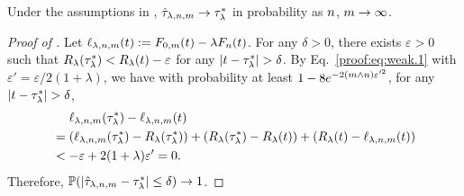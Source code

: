 \begin{lemma}\label{lemm:consistency}
Under the assumptions in ,
${\hat{\tau}_{\lambda, {n}, m}} \to {\tau^*_\lambda}$ in probability as ${n}$, $m \to \infty$.
\end{lemma}


\begin{proof}[Proof of ]
    Let ${{\ell}_{\lambda, {n}, m}}({t}):= {{F}_{0,m}}({t}) - \lambda {{F}_n}({t})$.
    For any $\delta > 0$, there exists $\varepsilon > 0$ such that ${R_{\lambda}}({\tau^*_\lambda}) < {R_{\lambda}}({t}) - \varepsilon$ for any $|{t} - {\tau^*_\lambda}| > \delta$.
    By Eq.~\eqref{proof:eq:weak.1} with $\varepsilon' = \varepsilon/2(1+\lambda)$, we have with probability at least $1 - 8 e^{-2 (m \wedge {n})\varepsilon'^2}$, for any $|{t} - {\tau^*_\lambda}| > \delta$,
    \begin{align*}
    &\quad~{{\ell}_{\lambda, {n}, m}}({\tau^*_\lambda})  - {{\ell}_{\lambda, {n}, m}}({t})\\
          &= ({{\ell}_{\lambda, {n}, m}}({\tau^*_\lambda})  - {R_{\lambda}}({\tau^*_\lambda}))
          + ({R_{\lambda}}({\tau^*_\lambda}) - {R_{\lambda}}({t}))
          + ({R_{\lambda}}({t}) - {{\ell}_{\lambda, {n}, m}}({t}))\\
          &< -\varepsilon + 2 (1+\lambda)\varepsilon'
          = 0.
    \end{align*}
   Therefore, $\mathbb{P}(|{\hat{\tau}_{\lambda, {n}, m}} - {\tau^*_\lambda}| \le \delta) \to 1$.
\end{proof}


